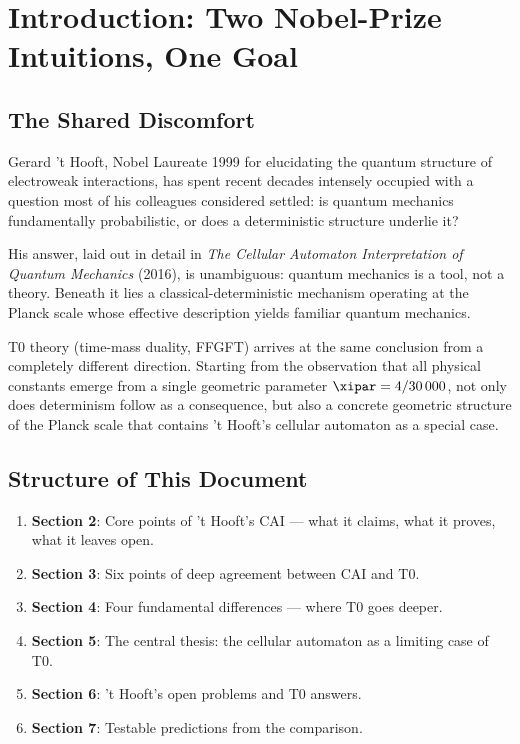 \section{Introduction: Two Nobel-Prize Intuitions, One Goal}
\label{sec:intro}

\subsection{The Shared Discomfort}

Gerard 't Hooft, Nobel Laureate 1999 for elucidating the quantum structure of
electroweak interactions, has spent recent decades intensely occupied with a
question most of his colleagues considered settled: is quantum mechanics
fundamentally probabilistic, or does a deterministic structure underlie it?

His answer, laid out in detail in \emph{The Cellular Automaton Interpretation of
Quantum Mechanics} (2016), is unambiguous: quantum mechanics is a tool, not a
theory. Beneath it lies a classical-deterministic mechanism operating at the
Planck scale whose effective description yields familiar quantum mechanics.

T0 theory (time-mass duality, FFGFT) arrives at the same conclusion from a
completely different direction. Starting from the observation that all physical
constants emerge from a single geometric parameter $\xipar = 4/30\,000$,
not only does determinism follow as a consequence, but also a concrete geometric
structure of the Planck scale that contains 't Hooft's cellular automaton as a
special case.

\subsection{Structure of This Document}

\begin{enumerate}
    \item \textbf{Section 2}: Core points of 't Hooft's CAI — what it claims,
    what it proves, what it leaves open.
    \item \textbf{Section 3}: Six points of deep agreement between CAI and T0.
    \item \textbf{Section 4}: Four fundamental differences — where T0 goes deeper.
    \item \textbf{Section 5}: The central thesis: the cellular automaton as a
    limiting case of T0.
    \item \textbf{Section 6}: 't Hooft's open problems and T0 answers.
    \item \textbf{Section 7}: Testable predictions from the comparison.
\end{enumerate}

